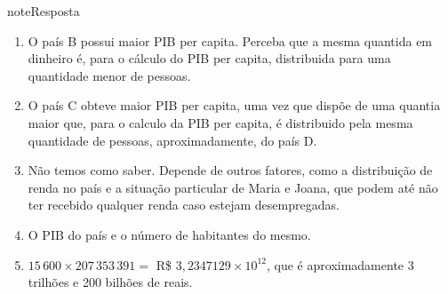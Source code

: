 \begin{sphinxadmonition}{note}{Resposta}
\begin{enumerate}
\item {} 
O país B possui maior PIB per capita. Perceba que a mesma quantida em dinheiro é, para o cálculo do PIB per capita, distribuida para uma quantidade menor de pessoas.

\item {} 
O país C obteve maior PIB per capita, uma vez que dispõe de uma quantia maior que, para o calculo da PIB per capita, é distribuido pela mesma quantidade de pessoas, aproximadamente, do país D.

\item {} 
Não temos como saber. Depende de outros fatores, como a distribuição de renda no país e a situação particular de Maria e Joana, que podem até não ter recebido qualquer renda caso estejam desempregadas.

\item {} 
O PIB do país e o número de habitantes do mesmo.

\item {} 
\(15\,600 \times 207\,353\,391 =\) R\$ \(3,2347129 \times 10^{12}\), que é aproximadamente 3 trilhões e 200 bilhões de reais.

\end{enumerate}
\end{sphinxadmonition}
\label{\detokenize{NO103-2:ativ-unidades-medida-e-og-densdemo}}
